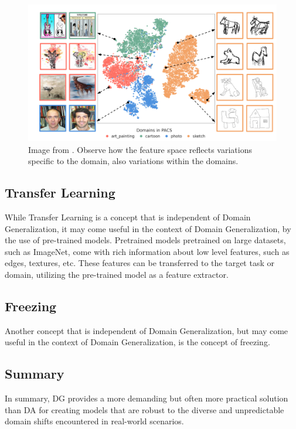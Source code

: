 \begin{figure}[ht!]
    \centering
    \includegraphics[width=0.85\linewidth]{images/Feature_Space-PACS.png}
    \caption{Image from \cite{thomasWhatsLatentLeveraging2025}. Observe how the feature space reflects variations specific to the domain, also variations within the domains.}
    \label{fig:feature_space}
\end{figure}

\subsection{Transfer Learning}

While Transfer Learning is a concept that is independent of Domain Generalization, it may come useful in the context of Domain Generalization, by the use of pre-trained models. Pretrained models pretrained on large datasets, such as ImageNet, come with rich information about low level features, such as edges, textures, etc. These features can be transferred to the target task or domain, utilizing the pre-trained model as a feature extractor.  


\subsection{Freezing}
Another concept that is independent of Domain Generalization, but may come useful in the context of Domain Generalization, is the concept of freezing.


\subsection*{Summary}
In summary, DG provides a more demanding but often more practical solution than DA for creating models that are robust to the diverse and unpredictable domain shifts encountered in real-world scenarios.

\clearpage